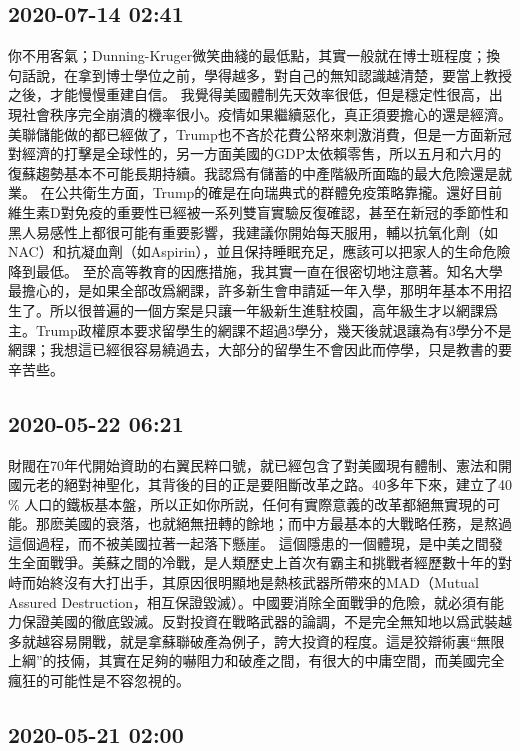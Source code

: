 \documentclass[twocolumn]{ctexart}
\begin{document}
\subsection*{2020-07-14 02:41}

你不用客氣；Dunning-Kruger微笑曲綫的最低點，其實一般就在博士班程度；換句話說，在拿到博士學位之前，學得越多，對自己的無知認識越清楚，要當上教授之後，才能慢慢重建自信。
我覺得美國體制先天效率很低，但是穩定性很高，出現社會秩序完全崩潰的機率很小。疫情如果繼續惡化，真正須要擔心的還是經濟。美聯儲能做的都已經做了，Trump也不吝於花費公帑來刺激消費，但是一方面新冠對經濟的打擊是全球性的，另一方面美國的GDP太依賴零售，所以五月和六月的復蘇趨勢基本不可能長期持續。我認爲有儲蓄的中產階級所面臨的最大危險還是就業。
在公共衛生方面，Trump的確是在向瑞典式的群體免疫策略靠攏。還好目前維生素D對免疫的重要性已經被一系列雙盲實驗反復確認，甚至在新冠的季節性和黑人易感性上都很可能有重要影響，我建議你開始每天服用，輔以抗氧化劑（如NAC）和抗凝血劑（如Aspirin），並且保持睡眠充足，應該可以把家人的生命危險降到最低。
至於高等教育的因應措施，我其實一直在很密切地注意著。知名大學最擔心的，是如果全部改爲網課，許多新生會申請延一年入學，那明年基本不用招生了。所以很普遍的一個方案是只讓一年級新生進駐校園，高年級生才以網課爲主。Trump政權原本要求留學生的網課不超過3學分，幾天後就退讓為有3學分不是網課；我想這已經很容易繞過去，大部分的留學生不會因此而停學，只是教書的要辛苦些。
\subsection*{2020-05-22 06:21}

財閥在70年代開始資助的右翼民粹口號，就已經包含了對美國現有體制、憲法和開國元老的絕對神聖化，其背後的目的正是要阻斷改革之路。40多年下來，建立了40 \% 人口的鐵板基本盤，所以正如你所説，任何有實際意義的改革都絕無實現的可能。那麽美國的衰落，也就絕無扭轉的餘地；而中方最基本的大戰略任務，是熬過這個過程，而不被美國拉著一起落下懸崖。
這個隱患的一個體現，是中美之間發生全面戰爭。美蘇之間的冷戰，是人類歷史上首次有霸主和挑戰者經歷數十年的對峙而始終沒有大打出手，其原因很明顯地是熱核武器所帶來的MAD（Mutual Assured Destruction，相互保證毀滅）。中國要消除全面戰爭的危險，就必須有能力保證美國的徹底毀滅。反對投資在戰略武器的論調，不是完全無知地以爲武裝越多就越容易開戰，就是拿蘇聯破產為例子，誇大投資的程度。這是狡辯術裏“無限上綱”的技倆，其實在足夠的嚇阻力和破產之間，有很大的中庸空間，而美國完全瘋狂的可能性是不容忽視的。
\subsection*{2020-05-21 02:00}
\end{document}
